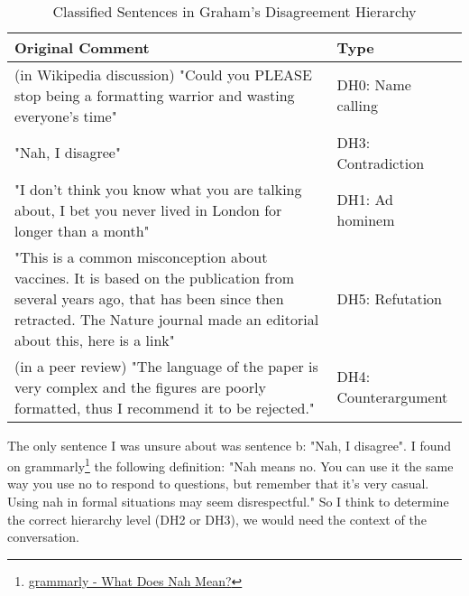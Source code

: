\documentclass[a4 paper]{article}
\numberwithin{equation}{section}
\newcommand{\problem}[2]{~\\\fbox{\textbf{Problem #1}}\newline\newline}
\newcommand{\0}{\mathbf{0}}
\begin{document}
\problem{3}{×}

\begin{table}[ht]
\centering
\begin{tabular}{|p{12cm}|l|}
\hline
\textbf{Original Comment} & \textbf{Type} \\
\hline
(in Wikipedia discussion) "Could you PLEASE stop being a formatting warrior and wasting everyone’s time" & DH0: Name calling \\
\hline
"Nah, I disagree" & DH3: Contradiction \\
\hline
"I don’t think you know what you are talking about, I bet you never lived in London for longer than a month" & DH1: Ad hominem \\
\hline
"This is a common misconception about vaccines. It is based on the publication from several years ago, that has been since then retracted. The Nature journal made an editorial about this, here is a link" & DH5: Refutation \\
\hline
(in a peer review) "The language of the paper is very complex and the figures are poorly formatted, thus I recommend it to be rejected." & DH4: Counterargument \\
\hline
\end{tabular}
\caption{Classified Sentences in Graham's Disagreement Hierarchy}
\label{tab:discourse-types}
\end{table}

The only sentence I was unsure about was sentence b: "Nah, I disagree". I found on grammarly\footnote{\href{https://www.grammarly.com/blog/nah-meaning/}{grammarly - What Does Nah Mean?}} the following definition: "Nah means no. You can use it the same way you use no to respond to questions, but remember that it’s very casual. Using nah in formal situations may seem disrespectful." So I think to determine the correct hierarchy level (DH2 or DH3), we would need the context of the conversation.
\end{document}

